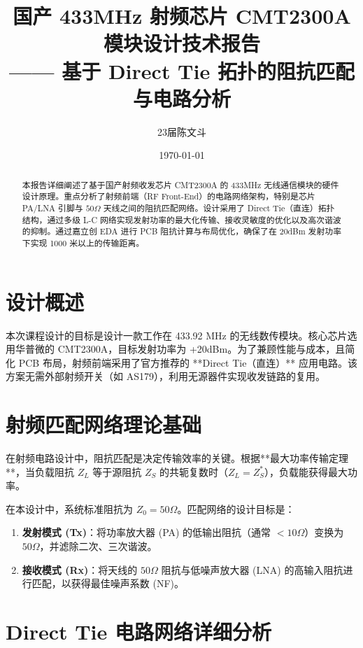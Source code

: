 \documentclass[a4paper,12pt]{article}
\title{\textbf{国产 433MHz 射频芯片 CMT2300A 模块设计技术报告}\\ \large —— 基于 Direct Tie 拓扑的阻抗匹配与电路分析}
\author{23届陈文斗}
\date{\today}
\begin{document}
	\maketitle
	\thispagestyle{empty}

	\begin{abstract}
		本报告详细阐述了基于国产射频收发芯片 CMT2300A 的 433MHz 无线通信模块的硬件设计原理。重点分析了射频前端（RF Front-End）的电路网络架构，特别是芯片 PA/LNA 引脚与 $50\Omega$ 天线之间的阻抗匹配网络。设计采用了 Direct Tie（直连）拓扑结构，通过多级 L-C 网络实现发射功率的最大化传输、接收灵敏度的优化以及高次谐波的抑制。通过嘉立创 EDA 进行 PCB 阻抗计算与布局优化，确保了在 20dBm 发射功率下实现 1000 米以上的传输距离。
	\end{abstract}

	\newpage
	\tableofcontents
	\newpage

	\section{设计概述}
	本次课程设计的目标是设计一款工作在 433.92 MHz 的无线数传模块。核心芯片选用华普微的 CMT2300A，目标发射功率为 +20dBm。为了兼顾性能与成本，且简化 PCB 布局，射频前端采用了官方推荐的 **Direct Tie（直连）** 应用电路。该方案无需外部射频开关（如 AS179），利用无源器件实现收发链路的复用。

	\section{射频匹配网络理论基础}

	在射频电路设计中，阻抗匹配是决定传输效率的关键。根据**最大功率传输定理**，当负载阻抗 $Z_L$ 等于源阻抗 $Z_S$ 的共轭复数时（$Z_L = Z_S^*$），负载能获得最大功率。

	在本设计中，系统标准阻抗为 $Z_0 = 50\Omega$。匹配网络的设计目标是：
	\begin{enumerate}
		\item \textbf{发射模式 (Tx)}：将功率放大器 (PA) 的低输出阻抗（通常 $<10\Omega$）变换为 $50\Omega$，并滤除二次、三次谐波。
		\item \textbf{接收模式 (Rx)}：将天线的 $50\Omega$ 阻抗与低噪声放大器 (LNA) 的高输入阻抗进行匹配，以获得最佳噪声系数 (NF)。
	\end{enumerate}

	\section{Direct Tie 电路网络详细分析}
\end{document}
